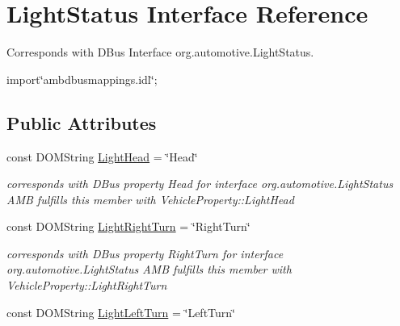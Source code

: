 \hypertarget{interfaceLightStatus}{\section{Light\+Status Interface Reference}
\label{interfaceLightStatus}
}


Corresponds with D\+Bus Interface org.\+automotive.\+Light\+Status.  




{\ttfamily import\char`\"{}ambdbusmappings.\+idl\char`\"{};}

\subsection*{Public Attributes}
\begin{DoxyCompactItemize}
\item 
\hypertarget{interfaceLightStatus_ad5fed88abc9ab3467f85346c1a3ed523}{const D\+O\+M\+String \hyperlink{interfaceLightStatus_ad5fed88abc9ab3467f85346c1a3ed523}{Light\+Head} = \char`\"{}Head\char`\"{}}\label{interfaceLightStatus_ad5fed88abc9ab3467f85346c1a3ed523}

\begin{DoxyCompactList}\small\item\em corresponds with D\+Bus property Head for interface org.\+automotive.\+Light\+Status A\+M\+B fulfills this member with Vehicle\+Property\+::\+Light\+Head \end{DoxyCompactList}\item 
\hypertarget{interfaceLightStatus_aaac65b16889ad6016f9776931108de87}{const D\+O\+M\+String \hyperlink{interfaceLightStatus_aaac65b16889ad6016f9776931108de87}{Light\+Right\+Turn} = \char`\"{}Right\+Turn\char`\"{}}\label{interfaceLightStatus_aaac65b16889ad6016f9776931108de87}

\begin{DoxyCompactList}\small\item\em corresponds with D\+Bus property Right\+Turn for interface org.\+automotive.\+Light\+Status A\+M\+B fulfills this member with Vehicle\+Property\+::\+Light\+Right\+Turn \end{DoxyCompactList}\item 
\hypertarget{interfaceLightStatus_a8089ab1202153ff2924a2215bfc70ecd}{const D\+O\+M\+String \hyperlink{interfaceLightStatus_a8089ab1202153ff2924a2215bfc70ecd}{Light\+Left\+Turn} = \char`\"{}Left\+Turn\char`\"{}}\label{interfaceLightStatus_a8089ab1202153ff2924a2215bfc70ecd}


\end{DoxyCompactItemize}
